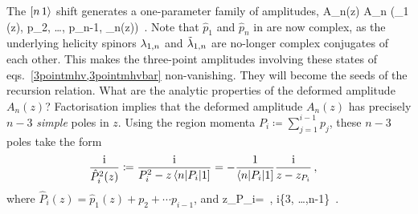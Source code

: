 The $[n\, 1\rangle$  shift generates
 a  one-parameter family of amplitudes,
 \be
 A_n(z) \coloneqq A_n \big(_1 (z), p_2, \ldots, p_{n-1}, _n(z)\big)\, .
 \ee 
Note that $\hat{p}_1$ and $\hat{p}_n$ in  are now complex, 
as the underlying helicity spinors $\lambda_{1,n}$ and $\tilde\lambda_{1,n}$ are
no-longer complex conjugates of each other.  This  makes  the three-point amplitudes 
involving these states of eqs.~\eqref{3pointmhv,3pointmhvbar}  non-vanishing. They will become the seeds of the recursion relation. 
%
What are the analytic properties of  the deformed amplitude $A_{n}(z)$?
Factorisation implies   that the deformed amplitude $A_{n}(z)$  has precisely
$n{-}3$ \emph{simple} poles in $z$. Using the region momenta  $P_{i}\coloneqq\sum_{j=1}^{i-1}p_{j}$, these $n{-}3$ poles take the form 
\begin{align}
\label{poleargumentbcfw}
\begin{split}
\frac{\mathrm{i}}{\hat{P}_{i}^2(z)} &
\coloneqq 
\frac{\mathrm{i}}{P_{i}^2 - z \, \langle n | P_{i} | 1 \rbrack} = -\frac{1}{\langle n | P_{i} | 1 \rbrack} 
\frac{\mathrm{i}}{z - z_{P_{i}} }
\, , 
\end{split}
\end{align}
where $\hat{P}_{i}(z) = \hat{p}_{1}(z) + p_{2} + \cdots p_{i-1}$, and 
%
\be
\label{zPidef}
z_{P_{i}}=\frac{P_{i}^{2}}{\lan n|P_{i}|1]}\, , \qquad \quad \forall i\in \{3,
\ldots ,n-1\}\, .
\ee
%
